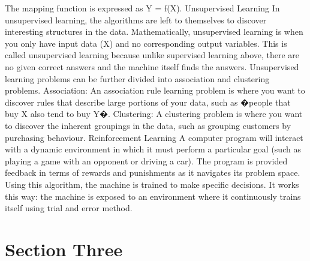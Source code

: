 The mapping function is expressed as Y = f(X).
Unsupervised Learning
In unsupervised learning, the algorithms are left to themselves to discover interesting structures in the data.
Mathematically, unsupervised learning is when you only have input data (X) and no corresponding output variables.
This is called unsupervised learning because unlike supervised learning above, there are no given correct answers and the machine itself finds the answers.
Unsupervised learning problems can be further divided into association and clustering problems.
Association: An association rule learning problem is where you want to discover rules that describe large portions of your data, such as �people that buy X also tend to buy Y�.
Clustering: A clustering problem is where you want to discover the inherent groupings in the data, such as grouping customers by purchasing behaviour.
Reinforcement Learning
A computer program will interact with a dynamic environment in which it must perform a particular goal (such as playing a game with an opponent or driving a car). The program is provided feedback in terms of rewards and punishments as it navigates its problem space.
Using this algorithm, the machine is trained to make specific decisions. It works this way: the machine is exposed to an environment where it continuously trains itself using trial and error method.

\section{Section Three}

